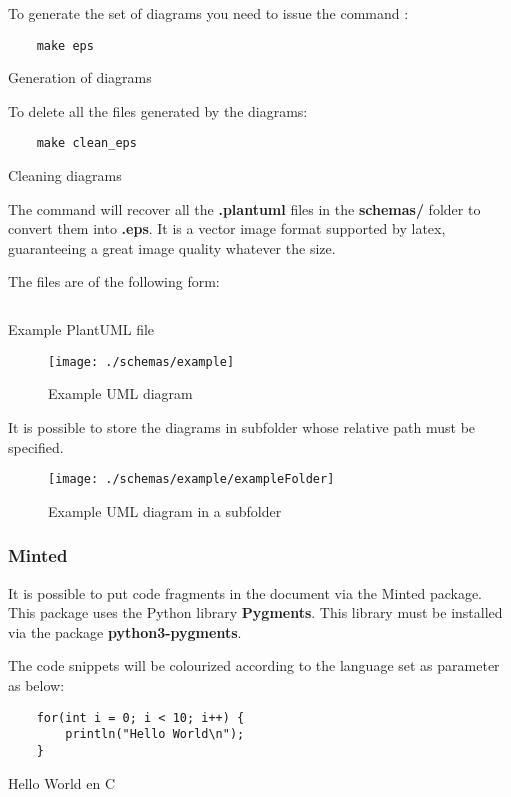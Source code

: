 To generate the set of diagrams you need to issue the command :
\begin{code}
    \begin{verbatim}
    make eps
\end{verbatim}
    \caption{Generation of diagrams}
\end{code}

To delete all the files generated by the diagrams:
\begin{code}
    \begin{verbatim}
    make clean_eps
\end{verbatim}
    \caption{Cleaning diagrams}
\end{code}

The command will recover all the \textbf{.plantuml} files
in the \textbf{schemas/} folder to convert them into \textbf{.eps}.
It is a vector image format supported by \gls{latex},
guaranteeing a great image quality whatever the size.

The files are of the following form:
\begin{code}
    \inputminted{vim}{schemas/example.plantuml}
    \caption{Example PlantUML file}
\end{code}

\begin{figure}[H]
    \centering
    \texttt{[image: ./schemas/example]}
    \caption{Example UML diagram}
\end{figure}

It is possible to store the diagrams in subfolder whose relative path must be specified.
\begin{figure}[H]
    \centering
    \texttt{[image: ./schemas/example/exampleFolder]}
    \caption{Example UML diagram in a subfolder}
\end{figure}

\subsubsection{Minted}
It is possible to put code fragments in the document via the Minted package.
This package uses the Python library \textbf{Pygments}.
This library must be installed via the package \textbf{python3-pygments}.

The code snippets will be colourized according to the language set as parameter as below:

\begin{code}
    \begin{verbatim}
    for(int i = 0; i < 10; i++) {
        println("Hello World\n");
    }
\end{verbatim}
    \caption{Hello World en C}
\end{code}

